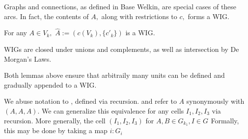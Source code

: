 Graphs and connections, as defined in Base Welkin, are special cases of these arcs. In fact, the contents of $A,$ along with restrictions to $c,$ forms a WIG.
\begin{lemma}

For any $A \in V_{k},$ $\hat{A} := (c(V_{k}), \{c'_{k}\})$ is a WIG.
\end{lemma}
\begin{lemma}
WIGs are closed under unions and complements, as well as intersection by De Morgan's Laws. %
\end{lemma}
Both lemmas above ensure that arbitraily many units can be defined and gradually appended to a WIG.




 We abuse notation to , defined via recursion. and refer to $A$ synonymously with $(A, A, A).$ We can generalize this equivalence for any cells $I_{1}, I_{2}, I_{3}$ via recursion. More generally, the cell $(I_{1}, I_{2}, I_{3})$ for $A, B \in G_{k_1}, I \in G_{}$
 Formally, this may be done by taking a map $i: G_{i}$


